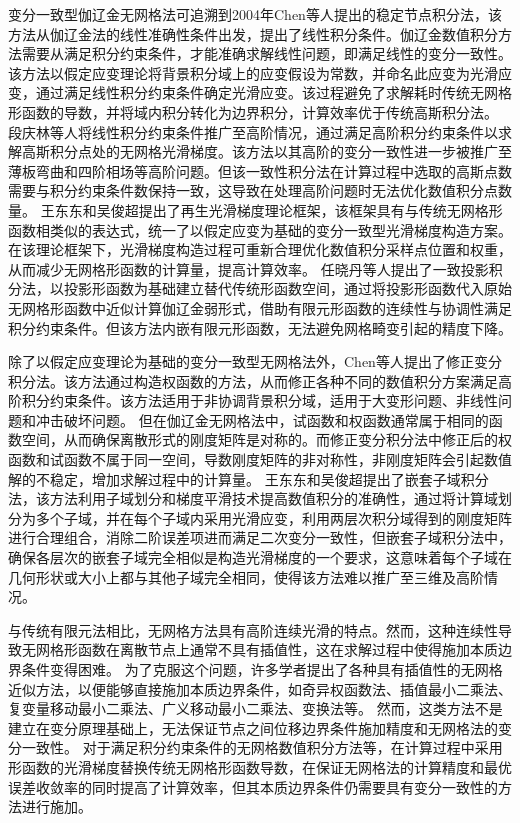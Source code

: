 变分一致型伽辽金无网格法可追溯到2004年Chen等人\cite{chen2001}提出的稳定节点积分法，该方法从伽辽金法的线性准确性条件出发，提出了线性积分条件。伽辽金数值积分方法需要从满足积分约束条件，才能准确求解线性问题，即满足线性的变分一致性。该方法以假定应变理论将背景积分域上的应变假设为常数，并命名此应变为光滑应变，通过满足线性积分约束条件确定光滑应变。该过程避免了求解耗时传统无网格形函数的导数，并将域内积分转化为边界积分，计算效率优于传统高斯积分法。
段庆林等人\cite{duan2012, duan2014}将线性积分约束条件推广至高阶情况，通过满足高阶积分约束条件以求解高斯积分点处的无网格光滑梯度。该方法以其高阶的变分一致性进一步被推广至薄板弯曲\cite{WangBingBing2019}和四阶相场\cite{shao2024}等高阶问题。但该一致性积分法在计算过程中选取的高斯点数需要与积分约束条件数保持一致，这导致在处理高阶问题时无法优化数值积分点数量。
王东东和吴俊超提出了再生光滑梯度理论框架\cite{wang2019}，该框架具有与传统无网格形函数相类似的表达式，统一了以假定应变为基础的变分一致型光滑梯度构造方案。在该理论框架下，光滑梯度构造过程可重新合理优化数值积分采样点位置和权重，从而减少无网格形函数的计算量，提高计算效率。
任晓丹等人\cite{wang2023}提出了一致投影积分法，以投影形函数为基础建立替代传统形函数空间，通过将投影形函数代入原始无网格形函数中近似计算伽辽金弱形式，借助有限元形函数的连续性与协调性满足积分约束条件。但该方法内嵌有限元形函数，无法避免网格畸变引起的精度下降。

除了以假定应变理论为基础的变分一致型无网格法外，Chen等人\cite{chen1996}提出了修正变分积分法。该方法通过构造权函数的方法，从而修正各种不同的数值积分方案满足高阶积分约束条件。该方法适用于非协调背景积分域，适用于大变形问题、非线性问题和冲击破坏问题。
但在伽辽金无网格法中，试函数和权函数通常属于相同的函数空间，从而确保离散形式的刚度矩阵是对称的。而修正变分积分法中修正后的权函数和试函数不属于同一空间，导数刚度矩阵的非对称性，非刚度矩阵会引起数值解的不稳定，增加求解过程中的计算量。
王东东和吴俊超提出了嵌套子域积分法\cite{wang2016}，该方法利用子域划分和梯度平滑技术提高数值积分的准确性，通过将计算域划分为多个子域，并在每个子域内采用光滑应变，利用两层次积分域得到的刚度矩阵进行合理组合，消除二阶误差项进而满足二次变分一致性，但嵌套子域积分法中，确保各层次的嵌套子域完全相似是构造光滑梯度的一个要求，这意味着每个子域在几何形状或大小上都与其他子域完全相同，使得该方法难以推广至三维及高阶情况。

与传统有限元法相比，无网格方法具有高阶连续光滑的特点。然而，这种连续性导致无网格形函数在离散节点上通常不具有插值性，这在求解过程中使得施加本质边界条件变得困难。
为了克服这个问题，许多学者提出了各种具有插值性的无网格近似方法，以便能够直接施加本质边界条件\cite{CaoYang2020,fernandez-mendez2004}，如奇异权函数法\cite{kaljevic1997}、插值最小二乘法\cite{liu2019,ChenXinXin2021}、复变量移动最小二乘法\cite{ChengYuMin2005}、广义移动最小二乘法\cite{HuangJuan2007}、变换法\cite{chen2000}等。
然而，这类方法不是建立在变分原理基础上，无法保证节点之间位移边界条件施加精度和无网格法的变分一致性。
对于满足积分约束条件的无网格数值积分方法\cite{chen2001,duan2012,chen2013,wang2016,wang2019,wang2023}等，在计算过程中采用形函数的光滑梯度替换传统无网格形函数导数，在保证无网格法的计算精度和最优误差收敛率的同时提高了计算效率，但其本质边界条件仍需要具有变分一致性的方法进行施加\cite{WuJunChao2016,hillman2021}。

